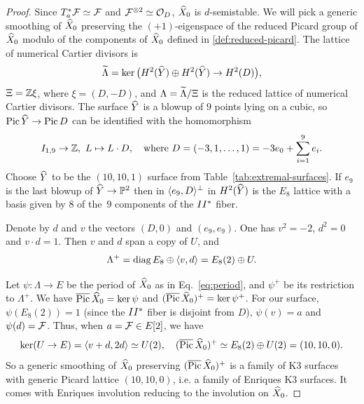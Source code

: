 \documentclass{amsart}
\begin{document}
\begin{proof}
  Since
  $T^*_a{\mathcal F}\simeq{\mathcal F}$ and ${\mathcal F}^{\otimes 2}\simeq{\mathcal O}_D$, ${\widehat X}_0$ is
  $d$-semistable. We will pick a generic smoothing of ${\widehat X}_0$
  preserving the $(+1)$-eigenspace of the reduced Picard group of
  ${\widehat X}_0$ modulo of the components of ${\widehat X}_0$ defined in
  \ref{def:reduced-picard}. 
  The lattice of numerical Cartier divisors is
  \begin{displaymath}
    \widetilde\Lambda = \ker\big( H^2({\widehat Y}) \oplus H^2({\widehat Y}) \to H^2(D) \big),
  \end{displaymath}
  $\Xi ={\mathbb Z}\xi$, where $\xi = (D,-D)$, and
  $\Lambda = \widetilde\Lambda/\Xi$ is the reduced lattice of numerical
  Cartier divisors.  The surface ${\widehat Y}$ is a blowup of $9$ points lying
  on a cubic, so $\operatorname{Pic} {\widehat Y}\to\operatorname{Pic} D$ can be identified with the
  homomorphism
  \begin{displaymath}
    I_{1,9}\to{\mathbb Z}, \ L\mapsto L\cdot D, \quad
    \text{where } D = (-3,1,\dotsc, 1) = -3e_0 + \sum_{i=1}^9 e_i.
  \end{displaymath}
  Choose ${\widehat Y}$ to be the $(10,10,1)$ surface from
  Table~\ref{tab:extremal-surfaces}. If $e_9$ is the last blowup of
  ${\widehat Y}\to{\mathbb P}^2$ then in $\langle e_9, D\rangle^\perp$ in $H^2({\widehat Y})$ is the $E_8$
  lattice with a basis given by $8$ of the~$9$ components of
  the $II^*$ fiber.

  Denote by $d$ and $v$ the vectors $(D,0)$ and $(e_9,e_9)$.  One has
  $v^2=-2$, $d^2=0$ and $v\cdot d = 1$.  Then $v$ and $d$ span a copy
  of $U$, and
  \begin{displaymath}
    \Lambda^+ = \operatorname{diag} E_8 \oplus \langle v, d\rangle = E_8(2) \oplus U.
  \end{displaymath}

  Let $\psi\colon\Lambda\to E$ be the period of ${\widehat X}_0$ as in
  Eq.~\eqref{eq:period}, and $\psi^+$ be its restriction to
  $\Lambda^+$.  We have $\overline{\operatorname{Pic}} \,{\widehat X}_0 = \ker\psi$ and
  $(\overline{\operatorname{Pic}}\, {\widehat X}_0)^+ = \ker \psi^+$. For our surface, $\psi(E_8(2))=1$
  (since the $II^*$ fiber is disjoint from $D$), $\psi(v) = a$ and
  $\psi(d) = {\mathcal F}$. Thus, when $a={\mathcal F}\in E[2]$, we have
  \begin{displaymath}
    \ker( U\to E) = \langle v+d, 2d\rangle \simeq U(2), 
    \quad (\overline{\operatorname{Pic}}\, {\widehat X}_0)^+ \simeq E_8(2) \oplus U(2) = (10,10,0).
  \end{displaymath}
  So a generic smoothing of ${\widehat X}_0$ preserving $(\overline{\operatorname{Pic}} \,{\widehat X}_0)^+$ is a
  family of K3 surfaces with generic Picard lattice $(10,10,0)$, i.e. a
  family of Enriques K3 surfaces. It comes with Enriques involution
  reducing to the involution on ${\widehat X}_0$. \end{proof}
\end{document}
